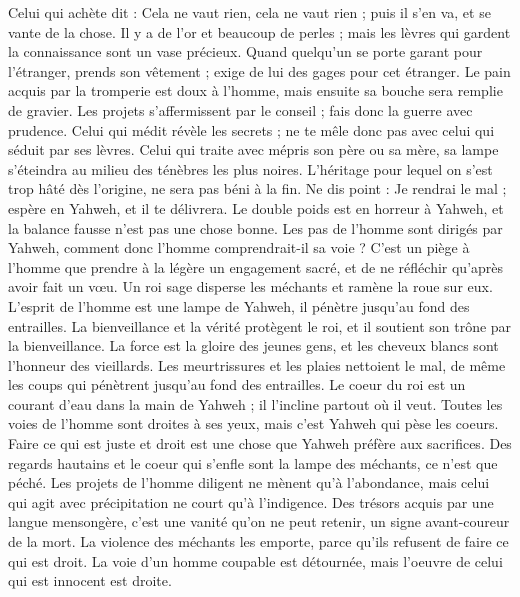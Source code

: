 \begin{multicols}{2}
Celui qui achète dit : Cela ne vaut rien, cela ne vaut rien ; puis il s'en va, et se vante de la chose.
Il y a de l'or et beaucoup de perles ; mais les lèvres qui gardent la connaissance sont un vase précieux.
Quand quelqu'un se porte garant pour l'étranger, prends son vêtement ;  exige de lui des gages pour cet étranger.
Le pain acquis par la tromperie est doux à l'homme, mais ensuite sa bouche sera remplie de gravier.
Les projets s'affermissent par le conseil ; fais donc la guerre avec prudence.
Celui qui médit révèle les secrets ; ne te mêle donc pas avec celui qui séduit par ses lèvres.
Celui qui traite avec mépris son père ou sa mère, sa lampe s’éteindra au milieu des ténèbres les plus noires.
L'héritage pour lequel on s'est trop hâté dès l’origine, ne sera pas béni à la fin.
Ne dis point : Je rendrai le mal ; espère en Yahweh, et il te délivrera.
Le double poids est en horreur à Yahweh, et la balance fausse n'est pas une chose bonne.
Les pas de l'homme sont dirigés par Yahweh, comment donc l'homme comprendrait-il sa voie ?
C'est un piège à l'homme que prendre à la légère un engagement sacré, et de ne réfléchir qu’après avoir fait un vœu.
Un roi sage disperse les méchants et ramène la roue sur eux.
L'esprit de l'homme est une lampe de Yahweh, il pénètre jusqu’au fond des entrailles.
La bienveillance et la vérité protègent le roi, et il soutient son trône par la bienveillance.
La force est la gloire des jeunes gens, et les cheveux blancs sont l'honneur des vieillards.
Les meurtrissures et les plaies nettoient le mal, de même les coups qui pénètrent jusqu'au fond des entrailles.
\VerseOne{}Le coeur du roi est un courant d’eau dans la main de Yahweh ; il l'incline partout où il veut.
Toutes les voies de l'homme sont droites à ses yeux, mais c’est Yahweh qui pèse les coeurs.
Faire ce qui est juste et droit est une chose que Yahweh préfère aux sacrifices.
Des regards hautains et le coeur qui s’enfle sont la lampe des méchants, ce n'est que péché.
Les projets de l’homme diligent ne mènent qu’à l'abondance, mais celui qui agit avec précipitation ne court qu’à l'indigence.
Des trésors acquis par une langue mensongère, c'est une vanité qu’on ne peut retenir, un signe avant-coureur de la mort.
La violence des méchants les emporte, parce qu'ils refusent de faire ce qui est droit.
La voie d’un homme coupable est détournée, mais l'oeuvre de celui qui est innocent est droite.

\end{multicols}
